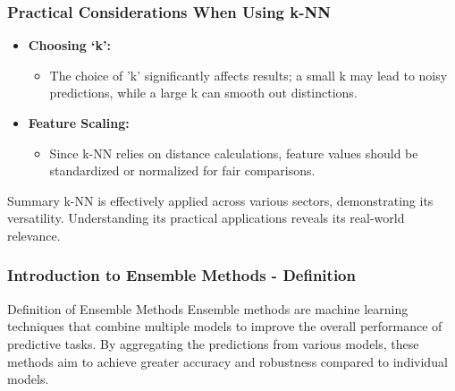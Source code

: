 \documentclass[aspectratio=169]{beamer}
\begin{document}
\begin{frame}[fragile]
    \frametitle{Practical Considerations When Using k-NN}
    \begin{itemize}
        \item \textbf{Choosing ‘k’:} 
        \begin{itemize}
            \item The choice of 'k' significantly affects results; a small k may lead to noisy predictions, while a large k can smooth out distinctions.
        \end{itemize}
        
        \item \textbf{Feature Scaling:} 
        \begin{itemize}
            \item Since k-NN relies on distance calculations, feature values should be standardized or normalized for fair comparisons.
        \end{itemize}
    \end{itemize}

    \begin{block}{Summary}
        k-NN is effectively applied across various sectors, demonstrating its versatility. Understanding its practical applications reveals its real-world relevance.
    \end{block}
\end{frame}

\begin{frame}[fragile]
  \frametitle{Introduction to Ensemble Methods - Definition}
  \begin{block}{Definition of Ensemble Methods}
    Ensemble methods are machine learning techniques that combine multiple models to improve the overall performance of predictive tasks. By aggregating the predictions from various models, these methods aim to achieve greater accuracy and robustness compared to individual models.
  \end{block}
\end{frame}
\end{document}
